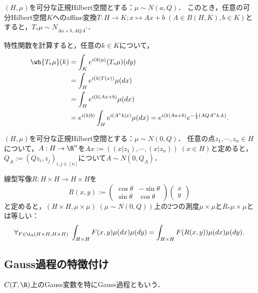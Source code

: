 \documentclass[uplatex,dvipdfmx]{jsreport}
\begin{document}
\begin{proposition}[有界線型汎関数はGauss測度を保つ]
    $(H,\mu)$を可分な正規Hilbert空間とする：$\mu\sim N(a,Q)$．
    このとき，任意の可分Hilbert空間$K$へのaffine変換$T:H\to K;x\mapsto Ax+b\;(A\in B(H,K),b\in K)$とすると，$T_*\mu\sim N_{Aa+b,AQA^*}$．
\end{proposition}
\begin{Proof}
    特性関数を計算すると，任意の$k\in K$について，
    \begin{align*}
        \wh{T_*\mu}(k)&=\int_K e^{i(k|y)}(T_*\mu)(dy)\\
        &=\int_He^{i(k|T(x))}\mu(dx)\\
        &=\int_He^{i(k|Ax+b)}\mu(dx)\\
        &=e^{i(k|b)}\int_He^{i(A^*k|x)}\mu(dx)=e^{i(k|Aa+b)}e^{-\frac{1}{2}(AQA^*k,k)}.
    \end{align*}
\end{Proof}

\begin{corollary}
    $(H,\mu)$を可分な正規Hilbert空間とする：$\mu\sim N(0,Q)$．
    任意の点$z_1,\cdots,z_n\in H$について，$A:H\to\R^n$を$Ax:=((x|z_1),\cdots,(x|z_n))\;(x\in H)$と定めると，
    $Q_A:=(Qz_i,z_j)_{i,j\in[n]}$について$A\sim N(0,Q_A)$．
\end{corollary}

\begin{corollary}[Gauss測度の回転不変性]
    線型写像$R:H\times H\to H\times H$を
    \[R(x,y):=\begin{pmatrix}\cos\theta&-\sin\theta\\\sin\theta&\cos\theta\end{pmatrix}\begin{pmatrix}x\\y\end{pmatrix}\]
    と定めると，$(H\times H,\mu\times\mu)\;(\mu\sim N(0,Q))$上の2つの測度$\mu\times\mu$と$R_*\mu\times\mu$とは等しい：
    \[\forall_{F\in\L_b(H\times H;H\times H)}\;\int_{H\times H}F(x,y)\mu(dx)\mu(dy)=\int_{H\times H}F(R(x,y))\mu(dx)\mu(dy).\]
\end{corollary}

\subsection{Gauss過程の特徴付け}

\begin{tcolorbox}[colframe=ForestGreen, colback=ForestGreen!10!white,breakable,colbacktitle=ForestGreen!40!white,coltitle=black,fonttitle=\bfseries\sffamily,
title=]
    $C(T,\R)$上のGauss変数を特にGauss過程ともいう．
\end{tcolorbox}
\end{document}
